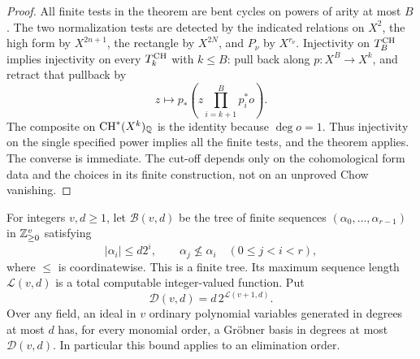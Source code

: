 \begin{proof}
All finite tests in the theorem are bent cycles on powers of
arity at most $B$.  The two normalization tests are detected by
the indicated relations on $X^2$, the high form by $X^{2n+1}$,
the rectangle by $X^{2N}$, and $P_\nu$ by $X^{r_\nu}$.
Injectivity on $T_B^{\operatorname{CH}}$ implies injectivity on every
$T_k^{\operatorname{CH}}$ with $k\leq B$: pull back along $p:X^B\to X^k$,
and retract that pullback by
\[
 z\longmapsto p_*\left(z\prod_{i=k+1}^{B}p_i^*o\right).
\]
The composite on $\operatorname{CH}^*(X^k)_\mathbb Q$ is the identity because
$\deg o=1$.  Thus injectivity on the single specified power
implies all the finite tests, and the theorem applies.  The
converse is immediate.  The cut-off depends only on the
cohomological form data and the choices in its finite
construction, not on an unproved Chow vanishing.
\end{proof}

\begin{lemma}
\label{c:recursive-elimination-bound}
For integers $v,d\geq1$, let $\mathcal B(v,d)$ be the tree of
finite sequences $(\alpha_0,\ldots,\alpha_{r-1})$ in $\mathbb Z_{\geq0}^v$
satisfying
\[
 |\alpha_i|\leq d2^i,
 \qquad \alpha_j\not\leq\alpha_i\quad(0\leq j<i<r),
\]
where $\leq$ is coordinatewise.  This is a finite tree.  Its
maximum sequence length $\mathcal L(v,d)$ is a total computable
integer-valued function.  Put
\[
 \mathcal D(v,d)=d\,2^{\mathcal L(v+1,d)}.
\]
Over any field, an ideal in $v$ ordinary polynomial variables
generated in degrees at most $d$ has, for every monomial order,
a Gr\"obner basis in degrees at most $\mathcal D(v,d)$.
In particular this bound applies to an elimination order.
\end{lemma}

